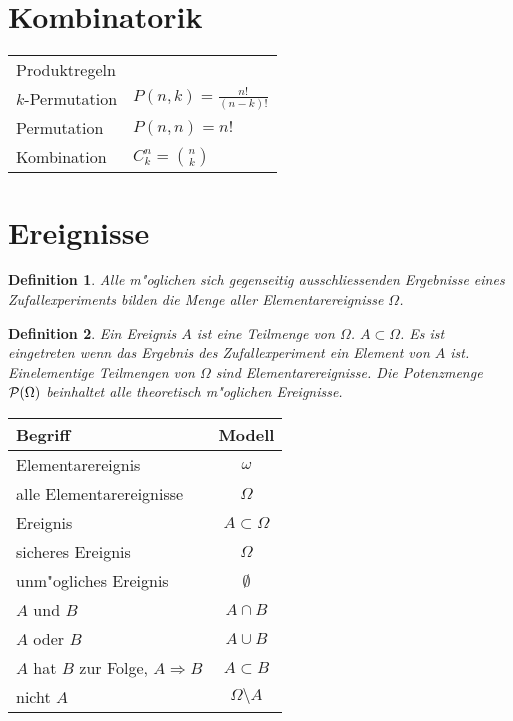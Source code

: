 \documentclass[ngerman, a4paper, 10pt, twocolumn, DIV20, headings=small]{scrartcl}
\newtheorem{definition}{Definition}
\begin{document}
\section{Kombinatorik}
\label{sec:kombinatorik}

\begin{tabular}{l l}
  Produktregeln &  \\
  $k$-Permutation &  $P(n,k) = \frac{n!}{(n-k)!}$\\
  Permutation & $P(n,n) = n!$ \\
  Kombination & $ C^n_k=\binom{n}{k} $ \\ 
\end{tabular}

\section{Ereignisse}
\label{sec:ereignisse}

\begin{definition}
  Alle m"oglichen sich gegenseitig ausschliessenden Ergebnisse eines Zufallexperiments bilden die Menge aller Elementarereignisse $\Omega$.
\end{definition}

\begin{definition}
  Ein Ereignis $A$ ist eine Teilmenge von $\Omega$. $A \subset \Omega$. Es ist eingetreten wenn das Ergebnis des Zufallexperiment ein Element von $A$ ist. Einelementige Teilmengen von $\Omega$ sind Elementarereignisse. Die Potenzmenge ${\cal P}(\Omega)$ beinhaltet alle theoretisch m"oglichen Ereignisse.
\end{definition}

\begin{tabular}{|l|c|}
\hline
Begriff&Modell\\
\hline
Elementarereignis&$\omega$\\
alle Elementarereignisse&$\Omega$\\
Ereignis&$A\subset\Omega$\\
sicheres Ereignis&$\Omega$\\
unm"ogliches Ereignis&$\emptyset$\\
$A$ und $B$&$A\cap B$\\
$A$ oder $B$&$A\cup B$\\
$A$ hat $B$ zur Folge, $A\Rightarrow B$&$A\subset B$\\
nicht $A$&$\Omega\setminus A$\\
\hline
\end{tabular}
\end{document}
